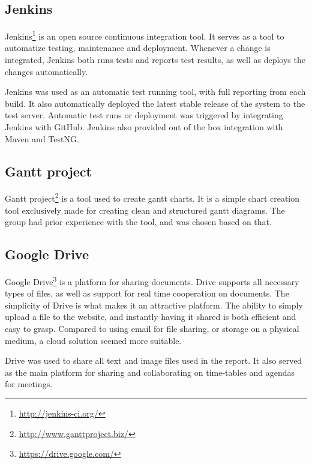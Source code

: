 \subsection{Jenkins}
\label{subsec:prestudies-tools-jenkins}

Jenkins\footnote{\url{http://jenkins-ci.org/}} is an open source continuous integration tool. It serves as a tool to automatize testing, maintenance and deployment. Whenever a change is integrated, Jenkins both runs tests and reports test results, as well as deploys the changes automatically.

Jenkins was used as an automatic test running tool, with full reporting from each build. It also automatically deployed the latest stable release of the system to the test server. Automatic test runs or deployment was triggered by integrating Jenkins with GitHub. Jenkins also provided out of the box integration with Maven and TestNG.

\subsection{Gantt project}
\label{subsec:prestudies-tools-gantt_project}

Gantt project\footnote{\url{http://www.ganttproject.biz/}} is a tool used to create gantt charts. It is a simple chart creation tool exclusively made for creating clean and structured gantt diagrams. The group had prior experience with the tool, and was chosen based on that.

\subsection{Google Drive}
\label{subsec:prestudies-tools-google_drive}

Google Drive\footnote{\url{https://drive.google.com/}} is a platform for sharing documents. Drive supports all necessary types of files, as well as support for real time cooperation on documents. The simplicity of Drive is what makes it an attractive platform. The ability to simply upload a file to the website, and instantly having it shared is both efficient and easy to grasp. Compared to using email for file sharing, or storage on a physical medium, a cloud solution seemed more suitable. 

Drive was used to share all text and image files used in the report. It also served as the main platform for sharing and collaborating on time-tables and agendas for meetings.

